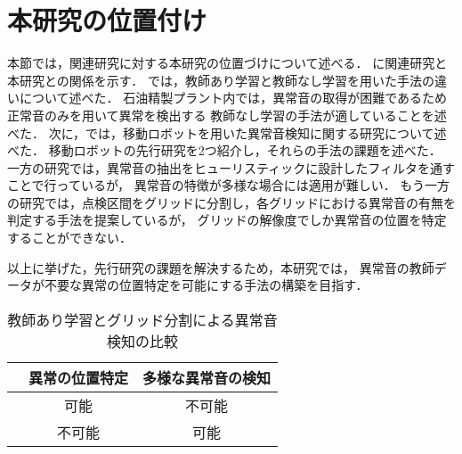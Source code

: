 \documentclass[../main]{subfiles}
\begin{document}
\section{本研究の位置付け}
\label{sec:related_work_summary}

本節では，関連研究に対する本研究の位置づけについて述べる．
に関連研究と本研究との関係を示す．
では，教師あり学習と教師なし学習を用いた手法の違いについて述べた．
石油精製プラント内では，異常音の取得が困難であるため正常音のみを用いて異常を検出する
教師なし学習の手法が適していることを述べた．
次に，では，移動ロボットを用いた異常音検知に関する研究について述べた．
移動ロボットの先行研究を2つ紹介し，それらの手法の課題を述べた．
一方の研究では，異常音の抽出をヒューリスティックに設計したフィルタを通すことで行っているが，
異常音の特徴が多様な場合には適用が難しい．
もう一方の研究では，点検区間をグリッドに分割し，各グリッドにおける異常音の有無を判定する手法を提案しているが，
グリッドの解像度でしか異常音の位置を特定することができない．

以上に挙げた，先行研究の課題を解決するため，本研究では，
異常音の教師データが不要な異常の位置特定を可能にする手法の構築を目指す．

\begin{table}[htbp]
  \centering
  \caption{教師あり学習とグリッド分割による異常音検知の比較}
  \label{tab:comparison}
  \begin{tabular}{|c|c|c|}
  \hline
   & 異常の位置特定 & 多様な異常音の検知 \\ \hline
  \cite{9023943} & 可能 & 不可能 \\ \hline
  \cite{10202270} & 不可能 & 可能 \\ \hline
  \end{tabular}
\end{table}
\end{document}

